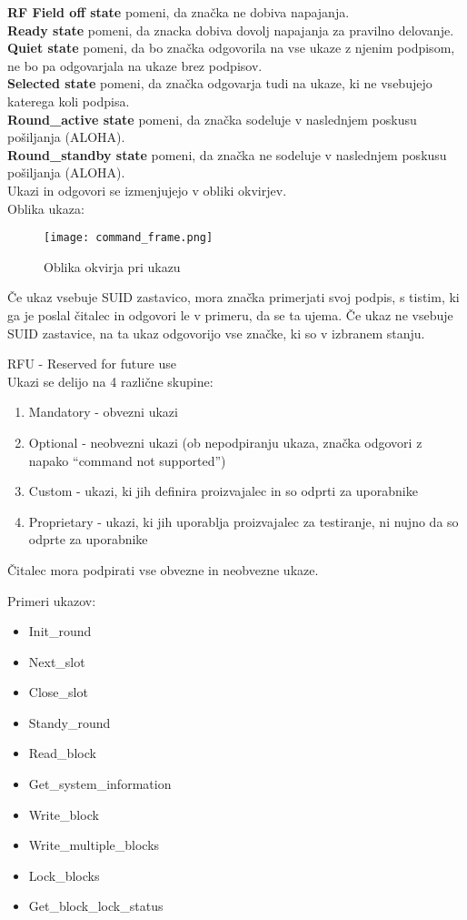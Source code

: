 \documentclass[]{article}
\begin{document}
\noindent
\textbf{RF Field off state} pomeni, da zna\v{c}ka ne dobiva
napajanja. \\
\textbf{Ready state} pomeni, da znacka dobiva dovolj napajanja za
pravilno delovanje. \\
\textbf{Quiet state} pomeni, da bo zna\v{c}ka odgovorila na vse ukaze
z njenim podpisom, ne bo pa odgovarjala na ukaze brez podpisov. \\
\textbf{Selected state} pomeni, da zna\v{c}ka odgovarja tudi na
ukaze, ki ne vsebujejo katerega koli podpisa. \\
\textbf{Round\_active state} pomeni, da zna\v{c}ka sodeluje v
naslednjem poskusu po\v{s}iljanja (ALOHA). \\
\textbf{Round\_standby state} pomeni, da zna\v{c}ka ne sodeluje v
naslednjem poskusu po\v{s}iljanja (ALOHA). \\

Ukazi in odgovori se izmenjujejo v obliki okvirjev. \\
Oblika ukaza:
\begin{figure}[H] %
  \centering
  \texttt{[image: command\_frame.png]}
  \caption{Oblika okvirja pri ukazu}
\end{figure}

\noindent
\v{C}e ukaz vsebuje SUID zastavico, mora zna\v{c}ka primerjati svoj
podpis, s tistim, ki ga je poslal \v{c}italec in odgovori le v
primeru, da se ta ujema. \v{C}e ukaz ne vsebuje SUID zastavice, na
ta ukaz odgovorijo vse zna\v{c}ke, ki so v izbranem stanju.

\noindent
RFU - Reserved for future use \\

\noindent
Ukazi se delijo na 4 razli\v{c}ne skupine:
\begin{enumerate}
  \item Mandatory - obvezni ukazi
  \item Optional - neobvezni ukazi (ob nepodpiranju ukaza, zna\v{c}ka
    odgovori z napako ``command not supported'')
  \item Custom - ukazi, ki jih definira proizvajalec in so odprti
    za uporabnike
  \item Proprietary - ukazi, ki jih uporablja proizvajalec za
    testiranje, ni nujno da so odprte za uporabnike
\end{enumerate}

\noindent
\v{C}italec mora podpirati vse obvezne in neobvezne ukaze.

\noindent
Primeri ukazov:
\begin{itemize}
  \item Init\_round
  \item Next\_slot
  \item Close\_slot
  \item Standy\_round
  \item Read\_block
  \item Get\_system\_information
  \item Write\_block
  \item Write\_multiple\_blocks
  \item Lock\_blocks
  \item Get\_block\_lock\_status
\end{itemize}
\end{document}
